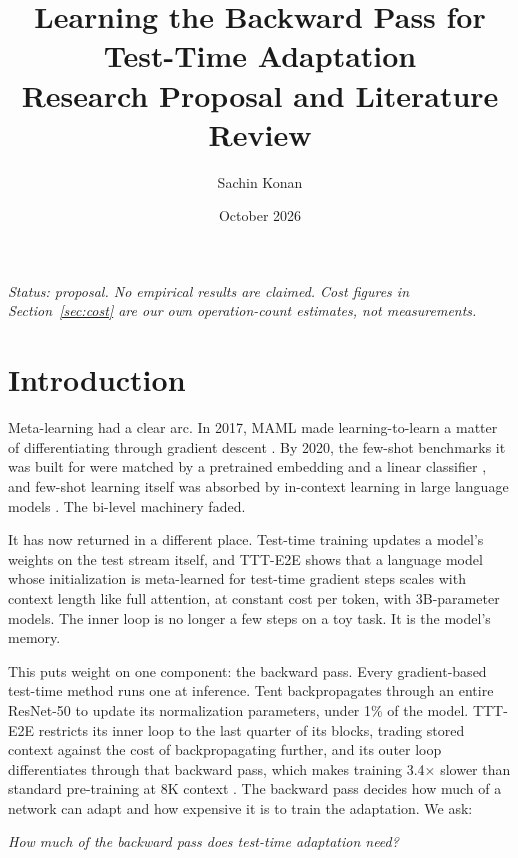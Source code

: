 \documentclass{article}
\title{Learning the Backward Pass for Test-Time Adaptation\\[4pt]
\large Research Proposal and Literature Review}
\author{Sachin Konan}
\date{October 2026}
\begin{document}
\maketitle

\noindent\emph{Status: proposal. No empirical results are claimed. Cost figures in
Section~\ref{sec:cost} are our own operation-count estimates, not measurements.}

\section{Introduction}

Meta-learning had a clear arc. In 2017, MAML made learning-to-learn a matter of
differentiating through gradient descent \parencite{finn2017maml}. By 2020, the
few-shot benchmarks it was built for were matched by a pretrained embedding and
a linear classifier \parencite{chen2019closer,tian2020rethinking,raghu2020anil},
and few-shot learning itself was absorbed by in-context learning in large
language models \parencite{brown2020gpt3}. The bi-level machinery faded.

It has now returned in a different place. Test-time training updates a model's
weights on the test stream itself, and TTT-E2E \parencite{tandon2025ttte2e}
shows that a language model whose initialization is meta-learned for test-time
gradient steps scales with context length like full attention, at constant cost
per token, with 3B-parameter models. The inner loop is no longer a few steps on
a toy task. It is the model's memory.

This puts weight on one component: the backward pass. Every gradient-based
test-time method runs one at inference. Tent \parencite{wang2021tent}
backpropagates through an entire ResNet-50 to update its normalization
parameters, under 1\% of the model. TTT-E2E restricts its inner loop to the
last quarter of its blocks, trading stored context against the cost of
backpropagating further, and its outer loop differentiates through that
backward pass, which makes training 3.4$\times$ slower than standard
pre-training at 8K context \parencite{nvidia2026ttt}. The backward pass decides how much of a network can
adapt and how expensive it is to train the adaptation. We ask:

\begin{center}
\emph{How much of the backward pass does test-time adaptation need?}
\end{center}
\end{document}
